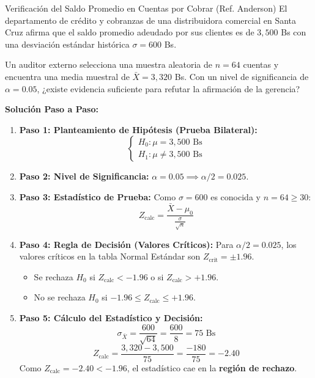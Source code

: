 \begin{ejemplo}{Verificación del Saldo Promedio en Cuentas por Cobrar (Ref. Anderson)}
El departamento de crédito y cobranzas de una distribuidora comercial en Santa Cruz afirma que el saldo promedio adeudado por sus clientes es de $3{,}500$ Bs con una desviación estándar histórica $\sigma = 600$ Bs. 

Un auditor externo selecciona una muestra aleatoria de $n = 64$ cuentas y encuentra una media muestral de $\bar{X} = 3{,}320$ Bs. Con un nivel de significancia de $\alpha = 0.05$, ¿existe evidencia suficiente para refutar la afirmación de la gerencia?

\tcbline
\textbf{Solución Paso a Paso:}
\begin{enumerate}
    \item \textbf{Paso 1: Planteamiento de Hipótesis (Prueba Bilateral):}
    \[
    \begin{cases} H_0: \mu = 3{,}500 \text{ Bs} \\ H_1: \mu \ne 3{,}500 \text{ Bs} \end{cases}
    \]
    
    \item \textbf{Paso 2: Nivel de Significancia:} $\alpha = 0.05 \implies \alpha/2 = 0.025$.
    
    \item \textbf{Paso 3: Estadístico de Prueba:}
    Como $\sigma = 600$ es conocida y $n = 64 \ge 30$:
    \[
    Z_{\text{calc}} = \frac{\bar{X} - \mu_0}{\frac{\sigma}{\sqrt{n}}}
    \]
    
    \item \textbf{Paso 4: Regla de Decisión (Valores Críticos):}
    Para $\alpha/2 = 0.025$, los valores críticos en la tabla Normal Estándar son $Z_{\text{crit}} = \pm 1.96$.
    \begin{itemize}
        \item Se rechaza $H_0$ si $Z_{\text{calc}} < -1.96$ o si $Z_{\text{calc}} > +1.96$.
        \item No se rechaza $H_0$ si $-1.96 \le Z_{\text{calc}} \le +1.96$.
    \end{itemize}
    
    \item \textbf{Paso 5: Cálculo del Estadístico y Decisión:}
    \[
    \sigma_{\bar{X}} = \frac{600}{\sqrt{64}} = \frac{600}{8} = 75 \text{ Bs}
    \]
    \[
    Z_{\text{calc}} = \frac{3{,}320 - 3{,}500}{75} = \frac{-180}{75} = -2.40
    \]
    Como $Z_{\text{calc}} = -2.40 < -1.96$, el estadístico cae en la \textbf{región de rechazo}.
    

\end{enumerate}
\end{ejemplo}
